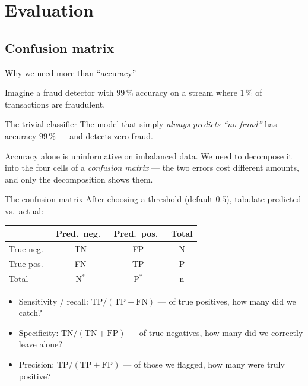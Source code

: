 \documentclass[aspectratio=169,11pt]{beamer}
\begin{document}
\section{Evaluation}
\subsection{Confusion matrix}

\begin{frame}{Why we need more than ``accuracy''}\label{frm:accuracy}
  \par
  Imagine a fraud detector with $99\,\%$ accuracy on a stream where
  $1\,\%$ of transactions are fraudulent.
  \begin{alertblock}{The trivial classifier}
    The model that simply \emph{always predicts ``no fraud''} has
    accuracy $99\,\%$ --- and detects zero fraud.
  \end{alertblock}
  \begin{takeaway}
    Accuracy alone is uninformative on imbalanced data. We need to
    decompose it into the four cells of a \emph{confusion matrix} --- the two
    errors cost different amounts, and only the decomposition shows them.
  \end{takeaway}
\end{frame}

\begin{frame}{The confusion matrix}\label{frm:confmat}
  After choosing a threshold (default $0.5$), tabulate predicted vs.\
  actual:
  \begin{center}
  \begin{tabular}{l|cc|c}
    \toprule
    & Pred.\ neg.\ & Pred.\ pos.\ & Total \\
    \midrule
    True neg.\ & TN & FP & N \\
    True pos.\ & FN & TP & P \\
    \midrule
    Total & N$^*$ & P$^*$ & n \\
    \bottomrule
  \end{tabular}
  \end{center}
  \begin{readme}
    \begin{itemize}
      \item Sensitivity / recall: $\mathrm{TP}/(\mathrm{TP+FN})$ ---
            of true positives, how many did we catch?
      \item Specificity: $\mathrm{TN}/(\mathrm{TN+FP})$ --- of true
            negatives, how many did we correctly leave alone?
      \item Precision: $\mathrm{TP}/(\mathrm{TP+FP})$ --- of those we
            flagged, how many were truly positive?
    \end{itemize}
  \end{readme}
\end{frame}
\end{document}
